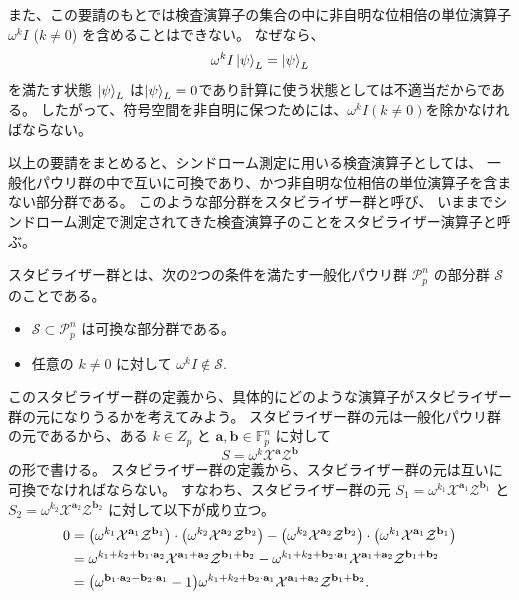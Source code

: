 \documentclass[../master.tex]{subfiles}
\begin{document}
また、この要請のもとでは検査演算子の集合の中に非自明な位相倍の単位演算子 $\omega^k I$ ($k\neq 0$) を含めることはできない。
なぜなら、
\begin{equation}
    \omega^k I\ket{\psi}_L=\ket{\psi}_L
\end{equation}
を満たす状態 $\ket{\psi}_L$ は$\ket{\psi}_L=0$であり計算に使う状態としては不適当だからである。
したがって、符号空間を非自明に保つためには、$\omega^kI (k\neq 0)$を除かなければならない。

以上の要請をまとめると、シンドローム測定に用いる検査演算子としては、
一般化パウリ群の中で互いに可換であり、かつ非自明な位相倍の単位演算子を含まない部分群である。
このような部分群をスタビライザー群と呼び、
いままでシンドローム測定で測定されてきた検査演算子のことをスタビライザー演算子と呼ぶ。
\begin{NoteBox}[title={スタビライザー群}]{}
スタビライザー群とは、次の2つの条件を満たす一般化パウリ群 $\mathcal{P}_{p}^n$ の部分群 $\mathcal{S}$ のことである。
    \begin{itemize}
        \item $\mathcal{S}\subset \mathcal{P}_{p}^n$ は可換な部分群である。
        \item 任意の $k\neq 0$ に対して $\omega^k I \notin \mathcal{S}$.
    \end{itemize}
\end{NoteBox}
このスタビライザー群の定義から、具体的にどのような演算子がスタビライザー群の元になりうるかを考えてみよう。
スタビライザー群の元は一般化パウリ群の元であるから、ある $k\in Z_p$ と $\mathbf{a},\mathbf{b}\in\mathbb{F}_p^n$ に対して
\begin{equation}
    S=\omega^k \mathcal{X}^{\mathbf{a}}\mathcal{Z}^{\mathbf{b}}
\end{equation}
の形で書ける。
スタビライザー群の定義から、スタビライザー群の元は互いに可換でなければならない。
すなわち、スタビライザー群の元 $S_1=\omega^{k_1} \mathcal{X}^{\mathbf{a}_1}\mathcal{Z}^{\mathbf{b}_1}$ と
$S_2=\omega^{k_2} \mathcal{X}^{\mathbf{a}_2}\mathcal{Z}^{\mathbf{b}_2}$ に対して以下が成り立つ。
\begin{equation}\begin{aligned}[b]
    0&=\qty(\omega^{k_1} \mathcal{X}^{\mathbf{a}_1}\mathcal{Z}^{\mathbf{b}_1})\cdot
    \qty(\omega^{k_2} \mathcal{X}^{\mathbf{a}_2}\mathcal{Z}^{\mathbf{b}_2})
    -\qty(\omega^{k_2} \mathcal{X}^{\mathbf{a}_2}\mathcal{Z}^{\mathbf{b}_2})\cdot
    \qty(\omega^{k_1} \mathcal{X}^{\mathbf{a}_1}\mathcal{Z}^{\mathbf{b}_1})\\
    &=
    \omega^{k_1+k_2+\mathbf{b}_1\cdot\mathbf{a}_2}
    \mathcal{X}^{\mathbf{a}_1+\mathbf{a}_2}\mathcal{Z}^{\mathbf{b}_1+\mathbf{b}_2}
    -
    \omega^{k_1+k_2+\mathbf{b}_2\cdot\mathbf{a}_1}
    \mathcal{X}^{\mathbf{a}_1+\mathbf{a}_2}\mathcal{Z}^{\mathbf{b}_1+\mathbf{b}_2}\\
    &=\qty(\omega^{\mathbf{b}_1\cdot\mathbf{a}_2-\mathbf{b}_2\cdot\mathbf{a}_1}-1)
    \omega^{k_1+k_2+\mathbf{b}_2\cdot\mathbf{a}_1}
    \mathcal{X}^{\mathbf{a}_1+\mathbf{a}_2}\mathcal{Z}^{\mathbf{b}_1+\mathbf{b}_2}.
\end{aligned}\end{equation}
\end{document}

